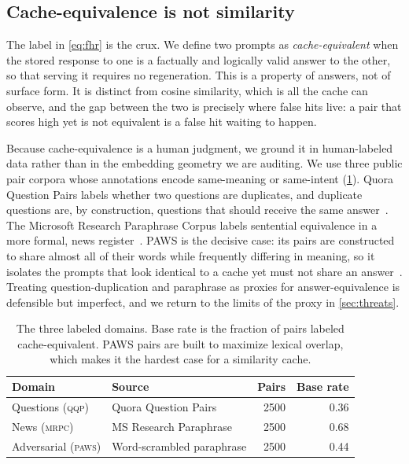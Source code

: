 \subsection{Cache-equivalence is not similarity}
The label in \cref{eq:fhr} is the crux. We define two prompts as \emph{cache-equivalent}
when the stored response to one is a factually and logically valid answer to the other,
so that serving it requires no regeneration. This is a property of answers, not of
surface form. It is distinct from cosine similarity, which is all the cache can observe,
and the gap between the two is precisely where false hits live: a pair that scores high
yet is not equivalent is a false hit waiting to happen.

Because cache-equivalence is a human judgment, we ground it in human-labeled data rather
than in the embedding geometry we are auditing. We use three public pair corpora whose
annotations encode same-meaning or same-intent (\cref{tab:datasets}). Quora Question
Pairs labels whether two questions are duplicates, and duplicate questions are, by
construction, questions that should receive the same answer~\cite{wang2019glue}. The
Microsoft Research Paraphrase Corpus labels sentential equivalence in a more formal,
news register~\cite{dolan2005mrpc}. \mbox{PAWS} is the decisive case: its pairs are
constructed to share almost all of their words while frequently differing in meaning, so
it isolates the prompts that look identical to a cache yet must not share an
answer~\cite{zhang2019paws}. Treating question-duplication and paraphrase as proxies for
answer-equivalence is defensible but imperfect, and we return to the limits of the proxy
in \cref{sec:threats}.

\begin{table}[t]
  \centering
  \begin{threeparttable}
    \caption{The three labeled domains. Base rate is the fraction of pairs labeled
      cache-equivalent. \mbox{PAWS} pairs are built to maximize lexical overlap, which
      makes it the hardest case for a similarity cache.}
    \label{tab:datasets}
    \begin{tabular}{l l r r}
      \toprule
      Domain & Source & Pairs & Base rate \\
      \midrule
      Questions (\textsc{qqp})   & Quora Question Pairs       & 2500 & 0.36 \\
      News (\textsc{mrpc})       & MS Research Paraphrase     & 2500 & 0.68 \\
      Adversarial (\textsc{paws}) & Word-scrambled paraphrase & 2500 & 0.44 \\
      \bottomrule
    \end{tabular}
  \end{threeparttable}
\end{table}

